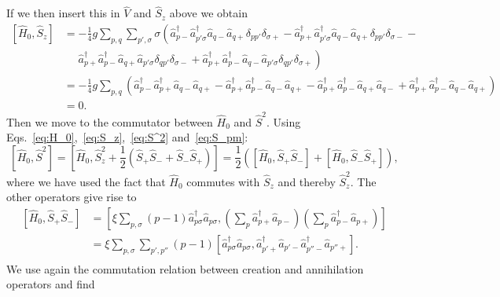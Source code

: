 \documentclass[a4paper,11pt,twoside]{article}
\begin{document}
%
If we then insert this in $\hat V$ and $\hat S_z$ above we obtain
\begin{align*}
\left[ \hat H_0 , \hat S_z \right]
%
&= -\frac{1}{4} g \sum_{p,q} \sum_{p',\sigma} \sigma \left(
\hat a_{p-}^\dagger \hat a_{p'\sigma}^\dagger \hat a_{q-} \hat a_{q+} \delta_{pp'} \delta_{\sigma+} -
\hat a_{p+}^\dagger \hat a_{p'\sigma}^\dagger \hat a_{q-} \hat a_{q+} \delta_{pp'} \delta_{\sigma-} - \right. \\
&\quad\,\, \left.
\hat a_{p+}^\dagger \hat a_{p-}^\dagger \hat a_{q+} \hat a_{p'\sigma} \delta_{qp'} \delta_{\sigma-} +
\hat a_{p+}^\dagger \hat a_{p-}^\dagger \hat a_{q-} \hat a_{p'\sigma} \delta_{qp'} \delta_{\sigma+} \right) \\
%
&= -\frac{1}{4} g \sum_{p,q} \left(
\hat a_{p-}^\dagger \hat a_{p+}^\dagger \hat a_{q-} \hat a_{q+} -
\hat a_{p+}^\dagger \hat a_{p-}^\dagger \hat a_{q-} \hat a_{q+} -
\hat a_{p+}^\dagger \hat a_{p-}^\dagger \hat a_{q+} \hat a_{q-} +
\hat a_{p+}^\dagger \hat a_{p-}^\dagger \hat a_{q-} \hat a_{q+} \right) \\
%
&= 0.
\end{align*}
%
Then we move to the commutator between
$\hat H_0$ and $\hat S^2$. Using Eqs.~\eqref{eq:H_0},~\eqref{eq:S_z},~\eqref{eq:S^2} and~\eqref{eq:S_pm}:
\[ 
\left[ \hat H_0, \hat S^2 \right]
%
= \left[ \hat H_0, \hat S_z^2 + \frac{1}{2} \left( \hat S_+ \hat S_- + \hat S_- \hat S_+ \right) \right]
%
= \frac{1}{2} \left(  \left[ \hat H_0, \hat S_+ \hat S_- \right] + \left[ \hat H_0, \hat S_- \hat S_+ \right] \right), \]
%
where we have used the fact that $\hat H_0$ commutes with $\hat S_z$ and thereby  $\hat S_z^2$. The other operators give rise to
\begin{align*}
\left[ \hat H_0, \hat S_+ \hat S_- \right]
%
&=  \left[ \xi \sum_{p,\sigma} (p-1) \hat a_{p\sigma}^\dagger \hat a_{p\sigma}, \left( \sum_p \hat a_{p+}^\dagger \hat a_{p-} \right) \left( \sum_p \hat a_{p-}^\dagger \hat a_{p+} \right) \right] \\
%
&= \xi \sum_{p,\sigma} \sum_{p',p''} (p-1)
\left[ \hat a_{p\sigma}^\dagger \hat a_{p\sigma},
\hat a_{p'+}^\dagger \hat a_{p'-} \hat a_{p''-}^\dagger \hat a_{p''+} \right] . \\
\end{align*}
%
We use again the commutation relation between creation and annihilation operators and find
\end{document}
